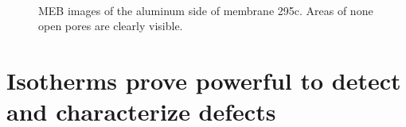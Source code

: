 \documentclass[../thesis.tex]{subfiles}
\begin{document}
        
        
        \begin{figure}[p]
          \\
          \caption{MEB images of the aluminum side of membrane 295c. Areas of none open pores are clearly visible.}
          \label{fig:295c-meb}
        \end{figure}


          \section{Isotherms prove powerful to detect and characterize defects}
          \label{sec:theory-and-defects}
\end{document}
